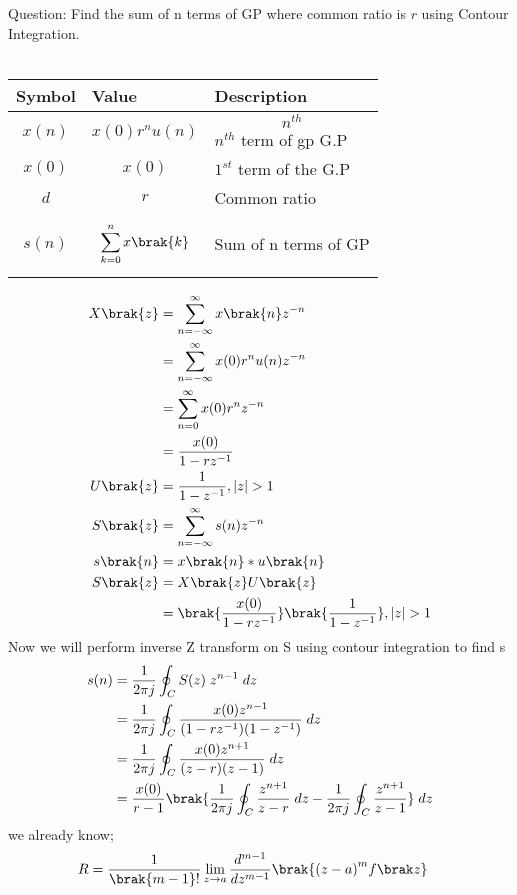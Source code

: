 \begin{enumerate}[label=\thechapter.\arabic*,ref=\thechapter.\theenumi]
Question: Find the sum of n terms of GP where common ratio is $r$ using Contour Integration. \\
\solution\\
\begin{tabular}{|p{2cm}|p{2.80cm}|p{2.70cm}|}
    \hline
    Symbol&Value&Description\\ \hline
    $$x(n)$$&$$x(0)r^{n}u(n)$$&$$n^{th}$$ $n^{th}$ term of gp G.P\\ \hline
    $$x(0)$$&$$x(0)$$&$1^{st}$ term of the G.P\\ \hline
    $$d$$&$$r$$&Common ratio\\ \hline
    $$s(n)$$&$$\sum_{k=0}^{n} x \brak{k}$$&Sum of n terms of GP\\ \hline
\end{tabular}
\begin{align}
X\brak{z} &= \sum_{n=-\infty}^{\infty} x\brak{n} z^{-n} \\
          &= \sum_{n=-\infty}^{\infty} x(0)r^{n}u(n)z^{-n} \\
          &= \sum_{n=0}^{\infty} x(0)r^{n}z^{-n} \\
          &= \frac{x(0)}{1-rz^{-1}} \\
U\brak{z} &= \frac{1}{1-z^{-1}}, |z|>1 \\
S\brak{z} &= \sum_{n=-\infty}^{\infty} s(n)z^{-n} \\
s\brak{n} &= x\brak{n} \ast u\brak{n} \\
S\brak{z} &= X\brak{z}U\brak{z} \\
          &= \brak{\frac{x(0)}{1-rz^{-1}}}\brak{\frac{1}{1-z^{-1}}}, |z|>1
\end{align}
Now we will perform inverse Z transform on S using contour integration to find s
\begin{align}
s(n) &= \frac{1}{2\pi j}\oint_{C}S(z)\;z^{n-1} \;dz \\
     &= \frac{1}{2\pi j}\oint_{C} \frac{x(0)z^{n-1}}{(1-rz^{-1})(1-z^{-1})} \;dz \\
     &= \frac{1}{2\pi j}\oint_{C} \frac{x(0)z^{n+1}}{(z-r)(z-1)} \;dz \\
     &= \frac{x(0)}{r-1}\brak{\frac{1}{2\pi j}\oint_{C} \frac{z^{n+1}}{z-r} \;dz - \frac{1}{2\pi j}\oint_{C} \frac{z^{n+1}}{z-1}} \;dz      
\end{align}
we already know;
\begin{align}
R &= \frac{1}{\brak {m-1}!}\lim\limits_{z\to a}\frac{d^{m-1}}{dz^{m-1}}\brak {{(z-a)}^{m}f\brak z}
\end{align}

\end{enumerate}
